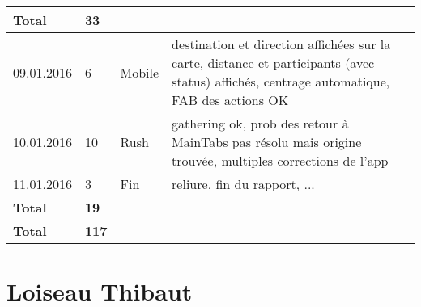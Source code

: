 \documentclass[french]{article}
\begin{document}
\begin{longtable}{p{}|p{}|p{}|p{}}
		\textbf{Total} & \textbf{33} &&\\
		\hline
		09.01.2016 & 6 & Mobile & destination et direction affichées sur la carte, distance et participants (avec status) affichés, centrage automatique, FAB des actions OK\\
		10.01.2016 & 10 & Rush & gathering ok, prob des retour à MainTabs pas résolu mais origine trouvée, multiples corrections de l'app\\
		11.01.2016 & 3 & Fin & reliure, fin du rapport, ...\\
		\textbf{Total} & \textbf{19} &&\\
		\hline\hline
		\textbf{Total} & \textbf{117} &&\\
	\end{longtable}

	\section*{Loiseau Thibaut}
\end{document}
